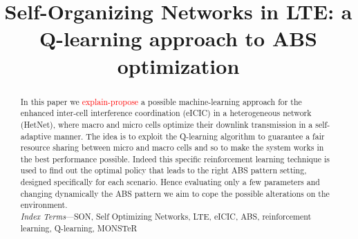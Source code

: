 \documentclass[conference,10pt]{IEEEtran}
\begin{document}
\title{Self-Organizing Networks	in LTE: a Q-learning approach to ABS optimization}

\author{
}

\maketitle

\begin{abstract}
In this paper we \textcolor{red}{explain-propose} a possible machine-learning approach for the enhanced inter-cell interference coordination (eICIC) in a heterogeneous network (HetNet), where macro and micro cells optimize their downlink transmission in a self-adaptive manner. The idea is to exploit the Q-learning algorithm to guarantee a fair resource sharing between micro and macro cells and so to make the system works in the best performance possible. Indeed this specific reinforcement learning technique is used to find out the optimal policy that leads to the right ABS pattern setting, designed specifically for each scenario. Hence evaluating only a few parameters and changing dynamically the ABS pattern we aim to cope the possible alterations on the environment.\\

\textit{Index  Terms}---SON, Self Optimizing Networks, LTE, eICIC, ABS, reinforcement learning, Q-learning, MONSTeR     
\end{abstract}

\end{document}
